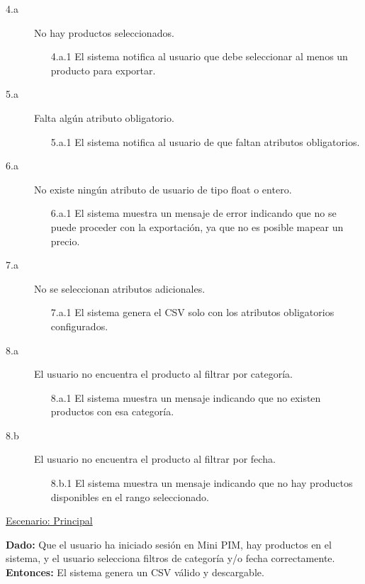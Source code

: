 \begin{description}
    \item[4.a] No hay productos seleccionados.
    \begin{enumerate}
        \item[4.a.1] El sistema notifica al usuario que debe seleccionar al menos un producto para exportar.
    \end{enumerate}
    \item[5.a] Falta algún atributo obligatorio.
    \begin{enumerate}
        \item[5.a.1] El sistema notifica al usuario de que faltan atributos obligatorios.
    \end{enumerate}
    \item[6.a] No existe ningún atributo de usuario de tipo float o entero.
    \begin{enumerate}
        \item[6.a.1] El sistema muestra un mensaje de error indicando que no se puede proceder con la exportación, ya que no es posible mapear un precio.
    \end{enumerate}
    \item[7.a] No se seleccionan atributos adicionales.
    \begin{enumerate}
        \item[7.a.1] El sistema genera el CSV solo con los atributos obligatorios configurados.
    \end{enumerate}
    \item[8.a] El usuario no encuentra el producto al filtrar por categoría.
    \begin{enumerate}
        \item[8.a.1] El sistema muestra un mensaje indicando que no existen productos con esa categoría.
    \end{enumerate}
    \item[8.b] El usuario no encuentra el producto al filtrar por fecha.
    \begin{enumerate}
        \item[8.b.1] El sistema muestra un mensaje indicando que no hay productos disponibles en el rango seleccionado.
    \end{enumerate}
\end{description}


\underline{Escenario: Principal}\par
\textbf{Dado:} Que el usuario ha iniciado sesión en Mini PIM, hay productos en el sistema, y el usuario selecciona filtros de categoría y/o fecha correctamente.  
\textbf{Entonces:} El sistema genera un CSV válido y descargable.\par


